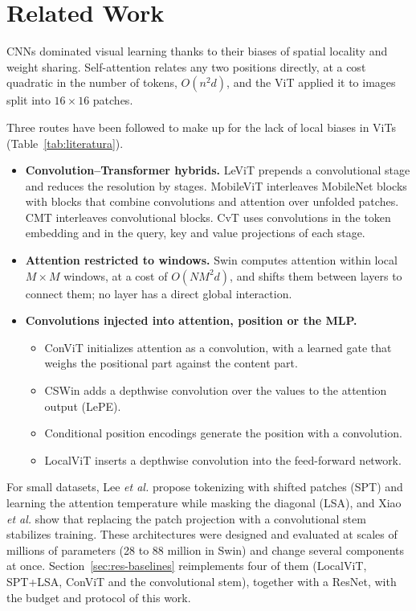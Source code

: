 \section{Related Work}
\label{sec:trabajos}
CNNs dominated visual learning thanks to their biases of spatial locality and weight sharing. Self-attention \cite{vaswani2017attention} relates any two positions directly, at a cost quadratic in the number of tokens, $O(n^2 d)$, and the ViT \cite{dosovitskiy2021image} applied it to images split into $16\times16$ patches.

Three routes have been followed to make up for the lack of local biases in ViTs (Table~\ref{tab:literatura}).
\begin{itemize}
  \item \textbf{Convolution--Transformer hybrids.} LeViT \cite{graham2021levit} prepends a convolutional stage and reduces the resolution by stages. MobileViT \cite{mehta2022mobilevit} interleaves MobileNet blocks with blocks that combine convolutions and attention over unfolded patches. CMT \cite{guo2022cmt} interleaves convolutional blocks. CvT \cite{wu2021cvt} uses convolutions in the token embedding and in the query, key and value projections of each stage.
  \item \textbf{Attention restricted to windows.} Swin \cite{liu2021swin} computes attention within local $M\times M$ windows, at a cost of $O(N M^2 d)$, and shifts them between layers to connect them; no layer has a direct global interaction.
  \item \textbf{Convolutions injected into attention, position or the MLP.}
  \begin{itemize}
    \item ConViT \cite{dascoli2021convit} initializes attention as a convolution, with a learned gate that weighs the positional part against the content part.
    \item CSWin \cite{dong2022cswin} adds a depthwise convolution over the values to the attention output (LePE).
    \item Conditional position encodings \cite{chu2023conditional} generate the position with a convolution.
    \item LocalViT \cite{li2021localvit} inserts a depthwise convolution into the feed-forward network.
  \end{itemize}
\end{itemize}
For small datasets, Lee \emph{et al.} \cite{lee2021vision} propose tokenizing with shifted patches (SPT) and learning the attention temperature while masking the diagonal (LSA), and Xiao \emph{et al.} \cite{xiao2021early} show that replacing the patch projection with a convolutional stem stabilizes training. These architectures were designed and evaluated at scales of millions of parameters (28 to 88 million in Swin) and change several components at once. Section~\ref{sec:res-baselines} reimplements four of them (LocalViT, SPT+LSA, ConViT and the convolutional stem), together with a ResNet, with the budget and protocol of this work.

